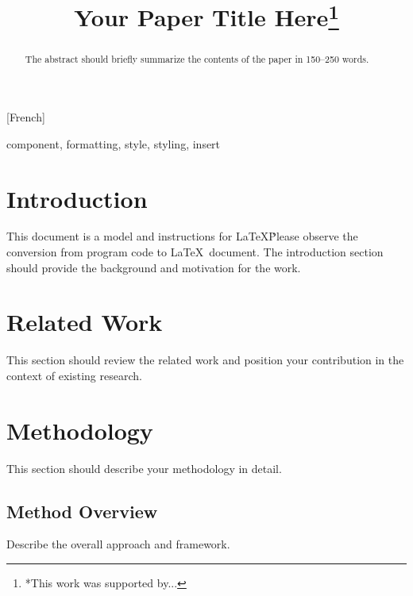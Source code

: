 [French] \documentclass[conference,twocolumn]{IEEEtran}
\begin{document}
\title{Your Paper Title Here\thanks{*This work was supported by...}}

\author{
\and
{}
}

\maketitle

\begin{abstract}
The abstract should briefly summarize the contents of the paper in 150--250 words.
\end{abstract}

\begin{IEEEkeywords}
component, formatting, style, styling, insert
\end{IEEEkeywords}

\section{Introduction}
This document is a model and instructions for \LaTeX\. Please observe the
conversion from program code to \LaTeX\ document. The introduction section
should provide the background and motivation for the work.

\section{Related Work}
This section should review the related work and position your contribution
in the context of existing research.

\section{Methodology}
This section should describe your methodology in detail.

\subsection{Method Overview}
Describe the overall approach and framework.
\end{document}
